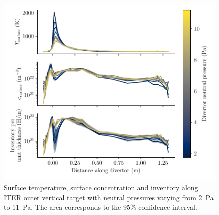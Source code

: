 

\begin{figure}[h!]
    \centering
    \includegraphics[width=\linewidth]{Figures/Chapter4/ITER/inventory_along_outer_divertor.pdf}
    \caption{Surface temperature, surface concentration and inventory along ITER outer vertical target with neutral pressures varying from \SI{2}{Pa} to \SI{11}{Pa}. The area corresponds to the 95\% confidence interval.}
    \label{fig: distrib outer target}
\end{figure}


